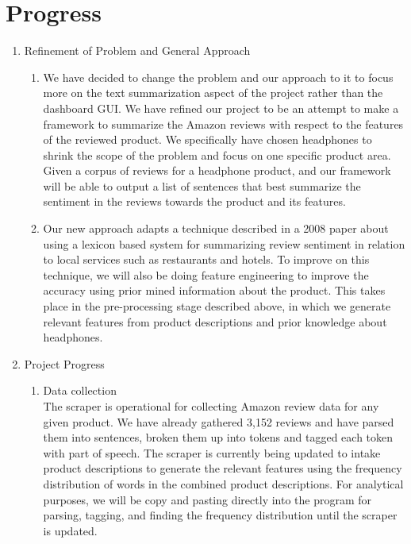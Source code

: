 \documentclass{article}
\begin{document}
\section{Progress}
\begin{enumerate}
\item Refinement of Problem and General Approach
	\begin{enumerate} [label* = \arabic*.]
	\item We have decided to change the problem and our approach to it to focus more on the text summarization aspect of the project rather than the dashboard GUI. We have refined our project to be an attempt to make a framework to summarize the Amazon reviews with respect to the features of the reviewed product. We specifically have chosen headphones to shrink the scope of the problem and focus on one specific product area. Given a corpus of reviews for a headphone product, and our framework will be able to output a list of sentences that best summarize the sentiment in the reviews towards the product and its features.
	\item Our new approach adapts a technique described in a 2008 paper about using a lexicon based system for summarizing review sentiment in relation to local services such as restaurants and hotels. To improve on this technique, we will also be doing feature engineering to improve the accuracy using prior mined information about the product. This takes place in the pre-processing stage described above, in which we generate relevant features from product descriptions and prior knowledge about headphones.
	\end{enumerate}
\item Project Progress \\
	\begin{enumerate} [label* = \arabic*.]
	\item Data collection \\
	The scraper is operational for collecting Amazon review data for any given product. We have already gathered 3,152 reviews and have parsed them into sentences, broken them up into tokens and tagged each token with part of speech. The scraper is currently being updated to intake product descriptions to generate the relevant features using the frequency distribution of words in the combined product descriptions. For analytical purposes, we will be copy and pasting directly into the program for parsing, tagging, and finding the frequency distribution until the scraper is updated. 
	\end{enumerate} 

\end{enumerate}
\end{document}
